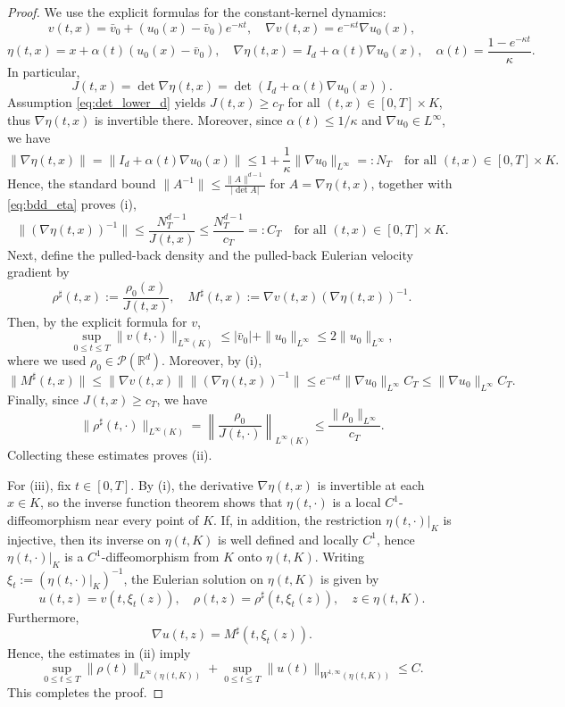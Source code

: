 \documentclass[11pt]{amsart}
\numberwithin{equation}{section}
\theoremstyle{definition}
\theoremstyle{remark}
\numberwithin{equation}{section}
\newcommand{\R}{\mathbb R}
\newcommand{\bq}{\begin{equation}}
\newcommand{\eq}{\end{equation}}
\newcommand{\lt}{\left}
\newcommand{\rt}{\right}
\newcommand{\calP}{\mathcal P}
\renewcommand{\ge}{\geqslant}
\renewcommand{\leq}{\leqslant}
\renewcommand{\le}{\leqslant}
\begin{document}
\begin{proof}
We use the explicit formulas for the constant-kernel dynamics:
\[
v(t,x)=\bar v_0+\lt(u_0(x)-\bar v_0\rt)e^{-\kappa t},
\quad
\nabla v(t,x)=e^{-\kappa t}\nabla u_0(x),
\]
\[
\eta(t,x)=x+\alpha(t)\lt(u_0(x)-\bar v_0\rt),
\quad
\nabla\eta(t,x)=I_d + \alpha(t)\nabla u_0(x),
\quad
\alpha(t)=\frac{1-e^{-\kappa t}}{\kappa}.
\]
In particular,
\[
J(t,x)=\det\nabla\eta(t,x)=\det(I_d + \alpha(t)\nabla u_0(x)).
\]
Assumption \eqref{eq:det_lower_d} yields $J(t,x)\ge c_T$ for all $(t,x)\in[0,T]\times K$, thus $\nabla\eta(t,x)$ is invertible there. Moreover, since $\alpha(t)\le 1/\kappa$ and
$\nabla u_0\in L^\infty$, we have
\bq\label{eq:bdd_eta}
\|\nabla\eta(t,x)\|=\|I_d + \alpha(t)\nabla u_0(x)\|
\le 1+\frac{1}{\kappa}\|\nabla u_0\|_{L^\infty} =: N_T \quad \text{for all } (t,x)\in[0,T]\times K.
\eq
Hence,  the standard bound $\displaystyle 
\|A^{-1}\|\le \frac{\|A\|^{d-1}}{|\det A|}$
for $A=\nabla\eta(t,x)$, together with \eqref{eq:bdd_eta} proves (i),
\[
\|(\nabla\eta(t,x))^{-1}\|\le \frac{N_T^{d-1}}{J(t,x)}\leq  \frac{N_T^{d-1}}{c_T}=:C_T\quad \text{for all }(t,x)\in[0,T]\times K.
\]
Next, define the pulled-back density and the pulled-back Eulerian velocity gradient by
\[
\rho^\sharp(t,x):=\frac{\rho_0(x)}{J(t,x)},\quad M^\sharp(t,x):=\nabla v(t,x)(\nabla\eta(t,x))^{-1}.
\]
Then, by the explicit formula for $v$,
\[
\sup_{0\le t\le T}\|v(t,\cdot)\|_{L^\infty(K)} \le |\bar v_0|+\|u_0\|_{L^\infty} \le 2\|u_0\|_{L^\infty},
\]
where we used $\rho_0\in\calP(\R^d)$. Moreover, by (i),
\bq\label{eq:pullback-grad-bd}
\|M^\sharp(t,x)\| \le \|\nabla v(t,x)\| \|(\nabla\eta(t,x))^{-1}\| \le e^{-\kappa t}\|\nabla u_0\|_{L^\infty} C_T \le \|\nabla u_0\|_{L^\infty} C_T .
\eq
Finally, since $J(t,x)\ge c_T$, we have
\[
\|\rho^\sharp(t,\cdot)\|_{L^\infty(K)} = \lt\|\frac{\rho_0}{J(t,\cdot)}\rt\|_{L^\infty(K)} \le \frac{\|\rho_0\|_{L^\infty}}{c_T}.
\]
Collecting these estimates proves (ii).

For (iii), fix $t\in[0,T]$. By (i), the derivative $\nabla\eta(t,x)$ is invertible at each $x\in K$, so the inverse function theorem shows that $\eta(t,\cdot)$ is a local $C^1$-diffeomorphism near every point of $K$. If, in addition, the restriction $\eta(t,\cdot)|_K$ is injective, then its inverse on $\eta(t,K)$ is well defined and locally $C^1$, hence $\eta(t,\cdot)|_K$ is a $C^1$-diffeomorphism from $K$ onto $\eta(t,K)$.
 Writing $\xi_t:=(\eta(t,\cdot)|_K)^{-1}$, the Eulerian solution on $\eta(t,K)$
is given by
\[
u(t,z)=v(t,\xi_t(z)),\quad \rho(t,z)=\rho^\sharp(t,\xi_t(z)),\quad z\in\eta(t,K).
\]
Furthermore,
\[
\nabla u(t,z)=M^\sharp(t,\xi_t(z)).
\]
Hence, the estimates in (ii) imply
\[
\sup_{0\le t\le T}\|\rho(t)\|_{L^\infty(\eta(t,K))} + \sup_{0\le t\le T}\|u(t)\|_{W^{1,\infty}(\eta(t,K))} \le C.
\]
This completes the proof.
\end{proof}
\end{document}
